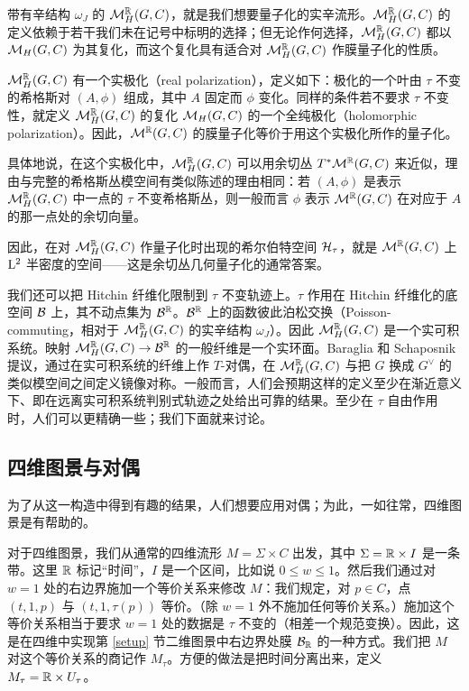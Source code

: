 带有辛结构 $\omega_J$ 的 ${\mathcal M}_H^{\mathbb R}(G,C)$，就是我们想要量子化的实辛流形。${\mathcal M}_H^{\mathbb R}(G,C)$ 的定义依赖于若干我们未在记号中标明的选择；但无论作何选择，${\mathcal M}_H^{\mathbb R}(G,C)$ 都以 ${\mathcal M}_H(G,C)$ 为其复化，而这个复化具有适合对 ${\mathcal M}_H^{\mathbb R}(G,C)$ 作膜量子化的性质。

${\mathcal M}_H^{\mathbb R}(G,C)$ 有一个实极化（real polarization），定义如下：极化的一个叶由 $\tau$ 不变的希格斯对 $(A,\phi)$ 组成，其中 $A$ 固定而 $\phi$ 变化。同样的条件若不要求 $\tau$ 不变性，就定义 ${\mathcal M}^{\mathbb R}_H(G,C)$ 的复化 ${\mathcal M}_H(G,C)$ 的一个全纯极化（holomorphic polarization）。因此，${\mathcal M}^{\mathbb R}(G,C)$ 的膜量子化等价于用这个实极化所作的量子化。

具体地说，在这个实极化中，${\mathcal M}_H^{\mathbb R}(G,C)$ 可以用余切丛 $T^*{\mathcal M}^{\mathbb R}(G,C)$ 来近似，理由与完整的希格斯丛模空间有类似陈述的理由相同：若 $(A,\phi)$ 是表示 ${\mathcal M}_H^{\mathbb R}(G,C)$ 中一点的 $\tau$ 不变希格斯丛，则一般而言 $\phi$ 表示 ${\mathcal M}^{\mathbb R}(G,C)$ 在对应于 $A$ 的那一点处的余切向量。

因此，在对 ${\mathcal M}^{\mathbb R}_H(G,C)$ 作量子化时出现的希尔伯特空间 ${\mathcal H}_\tau$，就是 ${\mathcal M}^{\mathbb R}(G,C)$ 上 ${\mathrm L}^2$ 半密度的空间——这是余切丛几何量子化的通常答案。

我们还可以把 Hitchin 纤维化限制到 $\tau$ 不变轨迹上。$\tau$ 作用在 Hitchin 纤维化的底空间 ${{\mathcal B}}$ 上，其不动点集为 ${{\mathcal B}}^{\mathbb R}$。${{\mathcal B}}^{\mathbb R}$ 上的函数彼此泊松交换（Poisson-commuting，相对于 ${\mathcal M}_H^{\mathbb R}(G,C)$ 的实辛结构 $\omega_J$）。因此 ${\mathcal M}_H^{\mathbb R}(G,C)$ 是一个实可积系统。映射 ${\mathcal M}_H^{\mathbb R}(G,C)\to {{\mathcal B}}^{\mathbb R}$ 的一般纤维是一个实环面。Baraglia 和 Schaposnik \cite{BaSc} 提议，通过在实可积系统的纤维上作 $T$-对偶，在 ${\mathcal M}_H^{\mathbb R}(G,C)$ 与把 $G$ 换成 $G^\vee$ 的类似模空间之间定义镜像对称。一般而言，人们会预期这样的定义至少在渐近意义下、即在远离实可积系统判别式轨迹之处给出可靠的结果。至少在 $\tau$ 自由作用时，人们可以更精确一些；我们下面就来讨论。

\subsection{四维图景与对偶}\label{fourdpic}

为了从这一构造中得到有趣的结果，人们想要应用对偶；为此，一如往常，四维图景是有帮助的。

对于四维图景，我们从通常的四维流形 $M=\Sigma\times C$ 出发，其中 $\Sigma={\mathbb R}\times I$ 是一条带。这里 ${\mathbb R}$ 标记“时间”，$I$ 是一个区间，比如说 $0\leq w\leq 1$。然后我们通过对 $w=1$ 处的右边界施加一个等价关系来修改 $M$：我们规定，对 $p\in C$，点 $(t,1,p)$ 与 $(t,1,\tau(p))$ 等价。（除 $w=1$ 外不施加任何等价关系。）施加这个等价关系相当于要求 $w=1$ 处的数据是 $\tau$ 不变的（相差一个规范变换）。因此，这是在四维中实现第 \ref{setup} 节二维图景中右边界处膜 ${\mathcal B}_{\mathbb R}$ 的一种方式。我们把 $M$ 对这个等价关系的商记作 $M_\tau$。方便的做法是把时间分离出来，定义 $M_\tau={\mathbb R}\times U_\tau$。

